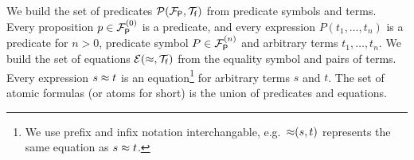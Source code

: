 
\begin{definition}\label{def:predicates}
	We build the set of {\myem predicates} $\mcPT$
	from predicate symbols and terms. 
	Every proposition $p\in \mcFPn[0]$ is a predicate, 
	and every expression $P(t_1,\ldots,t_n)$ is a predicate for $n>0$,
	predicate symbol $P\in\mcFPn$ and arbitrary terms $t_1,\ldots,t_n$.
%	
	We build the set of {\myem equations }$\mcET$ from the equality symbol and pairs of terms.
	Every expression $s\mEQ t$ is an equation\footnote{
		We use prefix and infix notation interchangable, e.g.~${\mEQ}(s,t)$ represents the same equation as $s\mEQ t$.} 
	for arbitrary terms $s$ and $t$.
%	
	The set of atomic formulas (or {\myem atoms }for short) is the union of predicates and equations.
\end{definition}